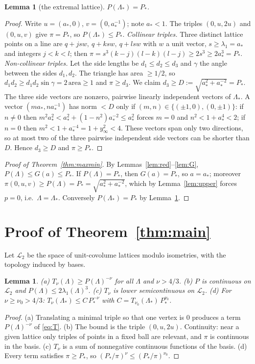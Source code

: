 \documentclass[11pt,a4paper]{amsart}
\newtheorem{lemma}[theorem]{Lemma}
\theoremstyle{definition}
\newcommand{\Lat}{\Lambda}
\begin{document}
\begin{lemma}[the extremal lattice]\label{lem:star}
$P(\Lat_*)=P_*$.
\end{lemma}
\begin{proof}
Write $u=(a_*,0)$, $v=(0,a_*^{-1})$; note $a_*<1$. The triples $(0,u,2u)$ and $(0,u,v)$ give $\pi=P_*$, so $P(\Lat_*)\le P_*$.
\emph{Collinear triples.} Three distinct lattice points on a line are $q+j s w,\ q+ksw,\ q+lsw$ with $w$ a unit vector, $s\ge\lambda_1=a_*$ and integers $j<k<l$; then $\pi=s^3(k-j)(l-k)(l-j)\ge2s^3\ge2a_*^3=P_*$.
\emph{Non-collinear triples.} Let the side lengths be $d_1\le d_2\le d_3$ and $\gamma$ the angle between the sides $d_1,d_2$. The triangle has area $\ge1/2$, so $d_1d_2\ge d_1d_2\sin\gamma=2\,\mathrm{area}\ge1$ and $\pi\ge d_3$.
We claim $d_3\ge D:=\sqrt{a_*^2+a_*^{-2}}=P_*$. The three side vectors are nonzero, pairwise linearly independent vectors of $\Lat_*$. A vector $(ma_*,na_*^{-1})$ has norm $<D$ only if $(m,n)\in\{(\pm1,0),(0,\pm1)\}$: if $n\neq0$ then $m^2a_*^2<a_*^2+(1-n^2)a_*^{-2}\le a_*^2$ forces $m=0$ and $n^2<1+a_*^4<2$; if $n=0$ then $m^2<1+a_*^{-4}=1+y_\infty^2<4$. These vectors span only two directions, so at most two of the three pairwise independent side vectors can be shorter than $D$. Hence $d_3\ge D$ and $\pi\ge P_*$.
\end{proof}

\begin{proof}[Proof of Theorem~\ref{thm:maxmin}]
By Lemmas~\ref{lem:red}--\ref{lem:G}, $P(\Lat)\le G(a)\le P_*$. If $P(\Lat)=P_*$, then $G(a)=P_*$, so $a=a_*$; moreover $\pi(0,u,v)\ge P(\Lat)=P_*=\sqrt{a_*^2+a_*^{-2}}$, which by Lemma~\ref{lem:upper} forces $p=0$, i.e.\ $\Lat=\Lat_*$. Conversely $P(\Lat_*)=P_*$ by Lemma~\ref{lem:star}.
\end{proof}

\section{Proof of Theorem~\ref{thm:main}}
Let $\mathcal L_2$ be the space of unit-covolume lattices modulo isometries, with the topology induced by bases.
\begin{lemma}\label{lem:basic}
(a) $T_\nu(\Lat)\ge P(\Lat)^{-\nu}$ for all $\Lat$ and $\nu>4/3$.
(b) $P$ is continuous on $\mathcal L_2$ and $P(\Lat)\le2\lambda_1(\Lat)^3$.
(c) $T_\nu$ is lower semicontinuous on $\mathcal L_2$.
(d) For $\nu\ge\nu_0>4/3$: $T_\nu(\Lat_*)\le C\,P_*^{-\nu}$ with $C=T_{\nu_0}(\Lat_*)\,P_*^{\nu_0}$.
\end{lemma}
\begin{proof}
(a) Translating a minimal triple so that one vertex is $0$ produces a term $P(\Lat)^{-\nu}$ of \eqref{eq:T}.
(b) The bound is the triple $(0,u,2u)$. Continuity: near a given lattice only triples of points in a fixed ball are relevant, and $\pi$ is continuous in the basis.
(c) $T_\nu$ is a sum of nonnegative continuous functions of the basis.
(d) Every term satisfies $\pi\ge P_*$, so $(P_*/\pi)^{\nu}\le(P_*/\pi)^{\nu_0}$.
\end{proof}
\end{document}
